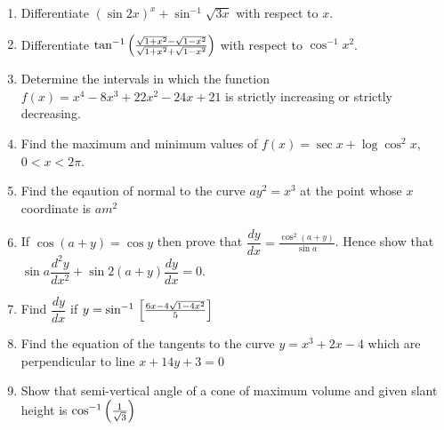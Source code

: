 \begin{enumerate}
    \item Differentiate $(\sin 2x)^x + \sin^{-1} \sqrt{3x}$ with respect to $x$.

    \item Differentiate $\tan^{-1} \left(\frac{\sqrt{1 + x^2}-\sqrt{1-x^2}}{\sqrt{1+x^2}+\sqrt{1-x^2}}\right)$
          with respect to $\cos^{-1} x^2$.

    \item Determine the intervals in which the function $f (x) = x^4 - 8x^3 + 22x^2 - 24x+21$ is strictly increasing or strictly decreasing.

    \item Find the maximum and minimum values of $f (x) = \sec x + \log \cos^2 x$, $0 < x < 2\pi$.

    \item Find the eqaution of normal to the curve $ay^2 = x^3$ at the point whose $x$ coordinate is $am^2$


    \item If $\cos(a+y) = \cos y$ then prove that
          $\dfrac{dy}{dx} = \frac{\cos^{2}(a+y)}{\sin a}$.
          Hence show that \\
          $\sin a \dfrac{d^{2}y}{dx^{2}} + \sin 2(a+y)\dfrac{dy}{dx} = 0 $.

    \item Find $\dfrac{dy}{dx}$ if $y = \sin^{-1}{}\left[\frac{6x - 4\sqrt{1-4x^2}}{5}\right]$

    \item Find the equation of the tangents to the curve $y = x^3 + 2x - 4$ which are perpendicular to line $x + 14y + 3 = 0$

    \item Show that semi-vertical angle of a cone of maximum volume and given slant height is
          $\cos^{-1}\left( \frac{1}{\sqrt{3}}\right)$


\end{enumerate}
